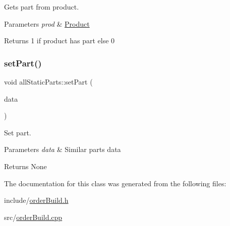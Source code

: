 Gets part from product. 


\begin{DoxyParams}{Parameters}
{\em prod} & \hyperlink{structProduct}{Product} \\
\hline
\end{DoxyParams}
\begin{DoxyReturn}{Returns}
1 if product has part else 0 
\end{DoxyReturn}
\mbox{\label{classallStaticParts_aaf0ad01ce61050e4f1f91cd25ef13dc8}} 
\subsubsection{\texorpdfstring{set\+Part()}{setPart()}}
{\footnotesize\ttfamily void all\+Static\+Parts\+::set\+Part (\begin{DoxyParamCaption}\item[{\hyperlink{structsimilarParts}{similar\+Parts} $\ast$}]{data }\end{DoxyParamCaption})}



Set part. 


\begin{DoxyParams}{Parameters}
{\em data} & Similar parts data \\
\hline
\end{DoxyParams}
\begin{DoxyReturn}{Returns}
None 
\end{DoxyReturn}


The documentation for this class was generated from the following files\+:\begin{DoxyCompactItemize}
\item 
include/\hyperlink{orderBuild_8h}{order\+Build.\+h}\item 
src/\hyperlink{orderBuild_8cpp}{order\+Build.\+cpp}\end{DoxyCompactItemize}
